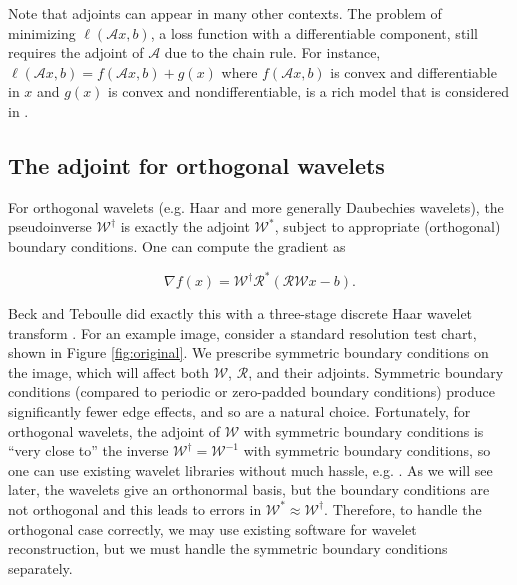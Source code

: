 \documentclass[journal]{IEEEtran}
\begin{document}

Note that adjoints can appear in many other contexts.  The problem of minimizing $\ell(\mathcal{A}x,b)$, a loss function with a differentiable component, still requires the adjoint of $\mathcal{A}$ due to the chain rule.  For instance, $\ell(\mathcal{A}x,b) = f(\mathcal{A}x,b)+g(x)$ where $f(\mathcal{A}x,b)$ is convex and differentiable in $x$ and $g(x)$ is convex and nondifferentiable, is a rich model that is considered in \cite{beck_2009b}. 

\subsection{The adjoint for orthogonal wavelets}
For orthogonal wavelets (e.g. Haar and more generally Daubechies wavelets), the pseudoinverse $\mathcal{W}^\dagger$ is exactly the adjoint $\mathcal{W}^\ast$, subject to appropriate (orthogonal) boundary conditions.  One can compute the gradient as

\[ \nabla f(x) = \mathcal{W}^\dagger \mathcal{R}^\ast \left(\mathcal{RW}x-b\right). \] 

\noindent Beck and Teboulle did exactly this with a three-stage discrete Haar wavelet transform \cite{beck_2009}.  For an example image, consider a standard resolution test chart, shown in Figure \ref{fig:original}.  We prescribe symmetric boundary conditions on the image, which will affect both $\mathcal{W}$, $\mathcal{R}$, and their adjoints.  Symmetric boundary conditions (compared to periodic or zero-padded boundary conditions) produce significantly fewer edge effects, and so are a natural choice.  Fortunately, for orthogonal wavelets, the adjoint of $\mathcal{W}$ with symmetric boundary conditions is ``very close to'' the inverse $\mathcal{W}^\dagger=\mathcal{W}^{-1}$ with symmetric boundary conditions, so one can use existing wavelet libraries without much hassle, e.g. \cite{matlab_wt_2015}.  As we will see later, the wavelets give an orthonormal basis, but the boundary conditions are not orthogonal and this leads to errors in $\mathcal{W}^\ast\approx\mathcal{W}^\dagger$.  Therefore, to handle the orthogonal case correctly, we may use existing software for wavelet reconstruction, but we must handle the symmetric boundary conditions separately.\\

\end{document}
